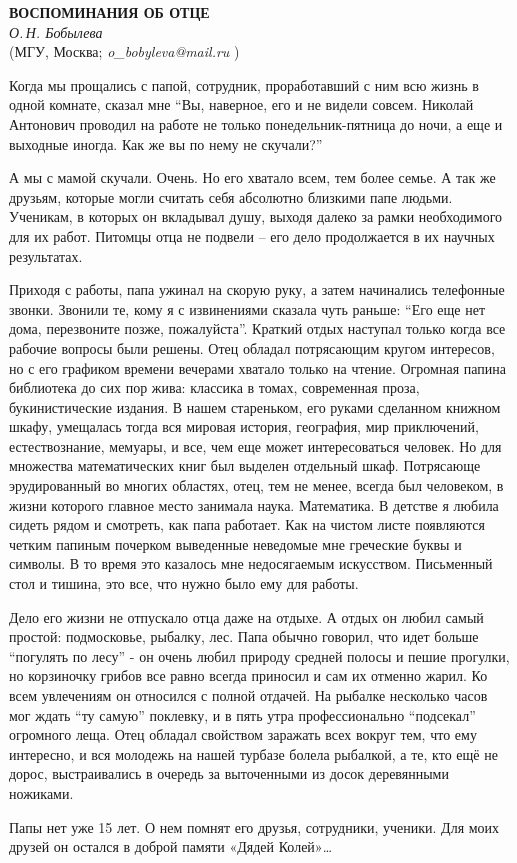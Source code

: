 \begin{center}{ \bf  ВОСПОМИНАНИЯ ОБ ОТЦЕ}\\
{\it О.\,Н. Бобылева} \\
(МГУ, Москва; {\it o\_bobyleva@mail.ru } )
\end{center}

Когда мы прощались с папой, сотрудник, проработавший с ним всю жизнь в одной комнате, сказал мне “Вы, наверное, его и не видели совсем. Николай Антонович проводил на работе не только понедельник-пятница до ночи, а еще и выходные иногда. Как же вы по нему не скучали?”

А мы с мамой скучали. Очень. Но его хватало всем, тем более семье. А так же друзьям, которые могли считать себя абсолютно близкими папе людьми. Ученикам, в которых он вкладывал душу, выходя далеко за рамки необходимого для их работ. Питомцы отца не подвели – его дело продолжается в их научных результатах.

Приходя с работы, папа ужинал на скорую руку, а затем начинались телефонные звонки. Звонили те, кому я с извинениями сказала чуть раньше: “Его еще нет дома, перезвоните позже, пожалуйста”. Краткий отдых наступал только когда все рабочие вопросы были решены. Отец обладал потрясающим кругом интересов, но с его графиком времени вечерами хватало только на чтение. Огромная папина библиотека до сих пор жива: классика в томах, современная проза, букинистические издания. В нашем стареньком, его руками сделанном книжном шкафу, умещалась тогда вся мировая история, география, мир приключений, естествознание, мемуары, и все, чем еще может интересоваться человек. Но для множества математических книг был выделен отдельный шкаф. Потрясающе эрудированный во многих областях, отец, тем не менее, всегда был человеком, в жизни которого главное место занимала наука. Математика. В детстве я любила сидеть рядом и смотреть, как папа работает. Как на чистом листе появляются четким папиным почерком выведенные неведомые мне греческие буквы и символы. В то время это казалось мне недосягаемым искусством. Письменный стол и тишина, это все, что нужно было ему для работы.

Дело его жизни не отпускало отца даже на отдыхе. А отдых он любил самый простой: подмосковье, рыбалку, лес. Папа обычно говорил, что идет больше “погулять по лесу” - он очень любил природу средней полосы и пешие прогулки, но корзиночку грибов все равно всегда приносил и сам их отменно жарил. Ко всем увлечениям он относился с полной отдачей. На рыбалке несколько часов мог ждать “ту самую” поклевку, и в пять утра профессионально “подсекал” огромного леща. Отец обладал свойством заражать всех вокруг тем, что ему интересно, и вся молодежь на нашей турбазе болела рыбалкой, а те, кто ещё не дорос, выстраивались в очередь за выточенными из досок деревянными ножиками.

Папы нет уже 15 лет. О нем помнят его друзья, сотрудники, ученики. Для моих друзей он остался в доброй памяти «Дядей Колей»…
